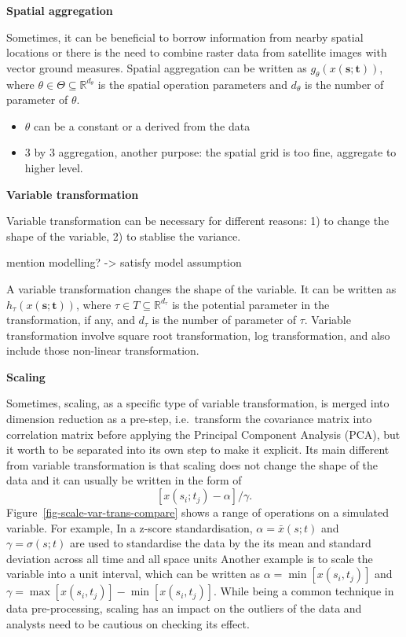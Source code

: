 \documentclass[
]{article}
\begin{document}
\textbf{Spatial aggregation}

Sometimes, it can be beneficial to borrow information from nearby
spatial locations or there is the need to combine raster data from
satellite images with vector ground measures. Spatial aggregation can be
written as \(g_{\mathcal{\theta}}(x(\mathbf{s};\mathbf{t}))\), where
\(\theta \in \Theta \subseteq \mathbb{R}^{d_{\theta}}\) is the spatial
operation parameters and \(d_{\theta}\) is the number of parameter of
\(\theta\).

\begin{itemize}
\item
  \(\theta\) can be a constant or a derived from the data
\item
  3 by 3 aggregation, another purpose: the spatial grid is too fine,
  aggregate to higher level.
\end{itemize}

\textbf{Variable transformation}

Variable transformation can be necessary for different reasons: 1) to
change the shape of the variable, 2) to stablise the variance.

mention modelling? -\textgreater{} satisfy model assumption

A variable transformation changes the shape of the variable. It can be
written as \(h_{\tau}(x(\mathbf{s};\mathbf{t}))\), where
\(\tau \in T \subseteq \mathbb{R}^{d_{\tau}}\) is the potential
parameter in the transformation, if any, and \(d_{\tau}\) is the number
of parameter of \(\tau\). Variable transformation involve square root
transformation, log transformation, and also include those non-linear
transformation.

\textbf{Scaling}

Sometimes, scaling, as a specific type of variable transformation, is
merged into dimension reduction as a pre-step, i.e.~transform the
covariance matrix into correlation matrix before applying the Principal
Component Analysis (PCA), but it worth to be separated into its own step
to make it explicit. Its main different from variable transformation is
that scaling does not change the shape of the data and it can usually be
written in the form of \[[x(s_i;t_j) - \alpha]/\gamma.\]
Figure~\ref{fig-scale-var-trans-compare} shows a range of operations on
a simulated variable. For example, In a z-score standardisation,
\(\alpha = \bar{x}(s; t)\) and \(\gamma = \sigma(s; t)\) are used to
standardise the data by the its mean and standard deviation across all
time and all space units Another example is to scale the variable into a
unit interval, which can be written as \(\alpha = \min[x(s_i, t_j)]\)
and \(\gamma = \max[x(s_i, t_j)] - \min[x(s_i, t_j)]\). While being a
common technique in data pre-processing, scaling has an impact on the
outliers of the data and analysts need to be cautious on checking its
effect.
\end{document}
